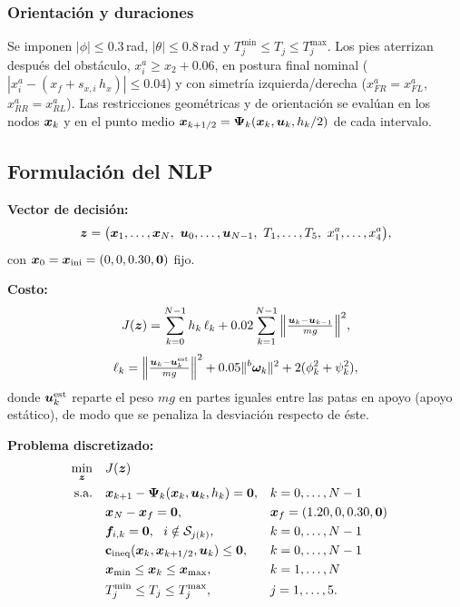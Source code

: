\subsubsection{Orientación y duraciones}
Se imponen $|\phi|\le0.3$\,rad, $|\theta|\le0.8$\,rad y $T_j^{\min}\le T_j\le T_j^{\max}$. Los pies aterrizan después del obstáculo, $x^a_i\ge x_2+0.06$, en postura final nominal ($|x^a_i-(x_f+s_{x,i}\,h_x)|\le0.04$) y con simetría izquierda/derecha ($x^a_{FR}=x^a_{FL}$, $x^a_{RR}=x^a_{RL}$). Las restricciones geométricas y de orientación se evalúan en los nodos $\bm{x}_k$ y en el punto medio $\bm{x}_{k+1/2}=\bm\Psi_k(\bm{x}_k,\bm{u}_k,h_k/2)$ de cada intervalo.

\subsection{Formulación del NLP}
\textbf{Vector de decisión:}
\begin{equation*}
\bz=\big(\bx_1,\dots,\bx_N,\ \bu_0,\dots,\bu_{N-1},\ T_1,\dots,T_5,\ x^a_1,\dots,x^a_4\big),
\end{equation*}
con $\bm{x}_0=\bm{x}_{\mathrm{ini}}=(0,0,0.30,\mathbf 0)$ fijo.

\textbf{Costo:} 
\begin{equation*}
J(\bm{z})=\sum_{k=0}^{N-1}h_k\,\ell_k+0.02\sum_{k=1}^{N-1}\Big\|\tfrac{\bm{u}_k-\bm{u}_{k-1}}{mg}\Big\|^2,
\end{equation*}
\begin{equation*}
\ell_k=\Big\|\tfrac{\bm{u}_k-\bm{u}^{\mathrm{est}}_k}{mg}\Big\|^2+0.05\|{}^b\bm{\omega}_k\|^2+2(\phi_k^2+\psi_k^2),
\end{equation*}
donde $\bm{u}^{\mathrm{est}}_k$ reparte el peso $mg$ en partes iguales entre las patas en apoyo (apoyo estático), de modo que se penaliza la desviación respecto de éste.

\textbf{Problema discretizado:}
\begin{equation*}
\begin{aligned}
\min_{\bm{z}}\quad & J(\bm{z})\\
\text{s.a.}\quad
& \bm{x}_{k+1}-\bm\Psi_k(\bm{x}_k,\bm{u}_k,h_k)=\mathbf 0, && k=0,\dots,N-1\\
& \bm{x}_N-\bm{x}_f=\mathbf 0, && \bm{x}_f=(1.20,0,0.30,\mathbf 0)\\
& \bm{f}_{i,k}=\mathbf 0,\ \ i\notin\mathcal S_{j(k)}, && k=0,\dots,N-1\\
& \mathbf c_{\mathrm{ineq}}(\bm{x}_k,\bm{x}_{k+1/2},\bm{u}_k)\le\mathbf 0, && k=0,\dots,N-1\\
& \bm{x}_{\min}\le\bm{x}_k\le\bm{x}_{\max}, && k=1,\dots,N\\
& T_j^{\min}\le T_j\le T_j^{\max}, && j=1,\dots,5.
\end{aligned}
\end{equation*}

